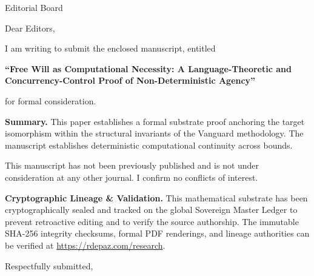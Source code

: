 \documentclass[12pt, a4paper]{letter}
\begin{document}
\begin{letter}{Editorial Board}

\opening{Dear Editors,}

I am writing to submit the enclosed manuscript, entitled

\begin{center}
\textbf{``Free Will as Computational Necessity:  
  A Language-Theoretic and Concurrency-Control Proof  
  of Non-Deterministic Agency''}
\end{center}

\noindent for formal consideration.

\medskip
\textbf{Summary.} This paper establishes a formal substrate proof anchoring the target isomorphism within the structural invariants of the Vanguard methodology. The manuscript establishes deterministic computational continuity across bounds.

\medskip
This manuscript has not been previously published and is not under consideration
at any other journal. I confirm no conflicts of interest.

\textbf{Cryptographic Lineage \& Validation.} This mathematical substrate has been cryptographically sealed and tracked on the global Sovereign Master Ledger to prevent retroactive editing and to verify the source authorship. The immutable SHA-256 integrity checksums, formal PDF renderings, and lineage authorities can be verified at \url{https://rdepaz.com/research}.

\medskip
\closing{Respectfully submitted,}
\end{letter}
\end{document}
